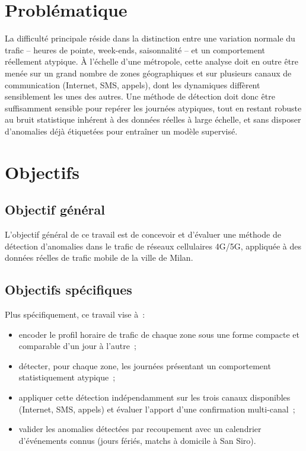 \section{Problématique}

La difficulté principale réside dans la distinction entre une
variation normale du trafic -- heures de pointe, week-ends,
saisonnalité -- et un comportement réellement atypique. À l'échelle
d'une métropole, cette analyse doit en outre être menée sur un grand
nombre de zones géographiques et sur plusieurs canaux de communication
(Internet, SMS, appels), dont les dynamiques diffèrent sensiblement
les unes des autres. Une méthode de détection doit donc être
suffisamment sensible pour repérer les journées atypiques, tout en
restant robuste au bruit statistique inhérent à des données réelles à
large échelle, et sans disposer d'anomalies déjà étiquetées pour
entraîner un modèle supervisé.

\section{Objectifs}

\subsection{Objectif général}

L'objectif général de ce travail est de concevoir et d'évaluer une
méthode de détection d'anomalies dans le trafic de réseaux cellulaires
4G/5G, appliquée à des données réelles de trafic mobile de la ville de
Milan.

\subsection{Objectifs spécifiques}

Plus spécifiquement, ce travail vise à~:
\begin{itemize}
  \item encoder le profil horaire de trafic de chaque zone sous une
        forme compacte et comparable d'un jour à l'autre~;
  \item détecter, pour chaque zone, les journées présentant un
        comportement statistiquement atypique~;
  \item appliquer cette détection indépendamment sur les trois canaux
        disponibles (Internet, SMS, appels) et évaluer l'apport d'une
        confirmation multi-canal~;
  \item valider les anomalies détectées par recoupement avec un
        calendrier d'événements connus (jours fériés, matchs à
        domicile à San Siro).
\end{itemize}

